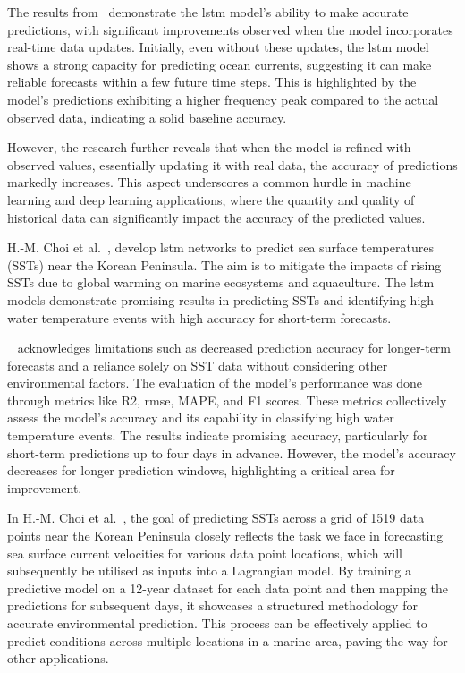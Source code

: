The results from~\cite{40} demonstrate the \acrshort{lstm} model's ability to make accurate predictions, with significant improvements observed when the model incorporates real-time data updates. Initially, even without these updates, the \acrshort{lstm} model shows a strong capacity for predicting ocean currents, suggesting it can make reliable forecasts within a few future time steps. This is highlighted by the model's predictions exhibiting a higher frequency peak compared to the actual observed data, indicating a solid baseline accuracy.

However, the research further reveals that when the model is refined with observed values, essentially updating it with real data, the accuracy of predictions markedly increases. This aspect underscores a common hurdle in machine learning and deep learning applications, where the quantity and quality of historical data can significantly impact the accuracy of the predicted values.\newline

H.-M. Choi et al.~\cite{44}, develop \acrshort{lstm} networks to predict sea surface temperatures (SSTs) near the Korean Peninsula. The aim is to mitigate the impacts of rising SSTs due to global warming on marine ecosystems and aquaculture. The \acrshort{lstm} models demonstrate promising results in predicting SSTs and identifying high water temperature events with high accuracy for short-term forecasts.

~\cite{44} acknowledges limitations such as decreased prediction accuracy for longer-term forecasts and a reliance solely on SST data without considering other environmental factors. The evaluation of the model's performance was done through metrics like R2, \acrshort{rmse}, MAPE, and F1 scores. These metrics collectively assess the model's accuracy and its capability in classifying high water temperature events. The results indicate promising accuracy, particularly for short-term predictions up to four days in advance. However, the model's accuracy decreases for longer prediction windows, highlighting a critical area for improvement.
 
In H.-M. Choi et al.~\cite{44}, the goal of predicting SSTs across a grid of 1519 data points near the Korean Peninsula closely reflects the task we face in forecasting sea surface current velocities for various data point locations, which will subsequently be utilised as inputs into a Lagrangian model. By training a predictive model on a 12-year dataset for each data point and then mapping the predictions for subsequent days, it showcases a structured methodology for accurate environmental prediction. This process can be effectively applied to predict conditions across multiple locations in a marine area, paving the way for other applications. 

